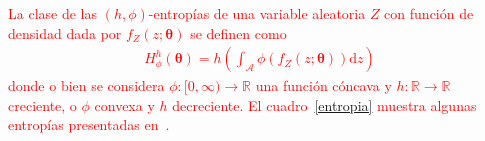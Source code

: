 \documentclass[11pt]{article}
\begin{document}
%
%


\textcolor{red}{
La clase de las $(h,\phi)$-entropías de una variable aleatoria $Z$ con función de densidad dada por $f_{Z}(z ; \boldsymbol{\theta})$ se definen como
\begin{align*}
H_{\phi}^{h}(\boldsymbol{\theta})=h\left(\int_{\mathcal{A}} \phi\left(f_{Z}(z ; \boldsymbol{\theta})\right) \mathrm{d} z\right)
\end{align*}
donde o bien se considera $\phi:[0, \infty) \rightarrow \mathbb{R}$ una función cóncava y $h: \mathbb{R} \rightarrow \mathbb{R}$ creciente, o $\phi$ convexa y $h$ decreciente. El cuadro~\ref{entropia} muestra algunas entropías presentadas en~\cite{Frery2019}.}
\end{document}
